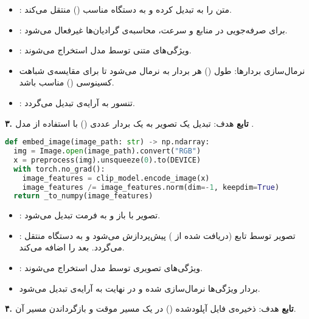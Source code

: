 \documentclass{article}
\begin{document}
\begin{itemize}
    \item {}: متن را به  تبدیل کرده و به دستگاه مناسب () منتقل می‌کند.
    \item {}: برای صرفه‌جویی در منابع و سرعت، محاسبه‌ی گرادیان‌ها غیرفعال می‌شود.
    \item {}: ویژگی‌های متنی توسط مدل  استخراج می‌شوند.
    \item نرمال‌سازی بردارها: طول () هر بردار به  نرمال می‌شود تا برای مقایسه‌ی شباهت کسینوسی () مناسب باشد.
    \item {}: تنسور  به آرایه‌ی  تبدیل می‌گردد.
\end{itemize}

\textbf{۳. تابع }
هدف: تبدیل یک تصویر به یک بردار عددی () با استفاده از مدل .

\begin{latin}
\begin{lstlisting}[language=Python]
def embed_image(image_path: str) -> np.ndarray:
  img = Image.open(image_path).convert("RGB")
  x = preprocess(img).unsqueeze(0).to(DEVICE)
  with torch.no_grad():
    image_features = clip_model.encode_image(x)
    image_features /= image_features.norm(dim=-1, keepdim=True)
  return _to_numpy(image_features)
\end{lstlisting}
\end{latin}

\begin{itemize}
    \item {}: تصویر با  باز و به فرمت  تبدیل می‌شود.
    \item {}: تصویر توسط تابع  (دریافت شده از ) پیش‌پردازش می‌شود و به دستگاه منتقل می‌گردد.  بعد  را اضافه می‌کند.
    \item {}: ویژگی‌های تصویری توسط مدل  استخراج می‌شوند.
    \item بردار ویژگی‌ها نرمال‌سازی شده و در نهایت به آرایه‌ی  تبدیل می‌شود.
\end{itemize}

\textbf{۴. تابع }
هدف: ذخیره‌ی فایل آپلودشده () در یک مسیر موقت و بازگرداندن مسیر آن.
\end{document}
